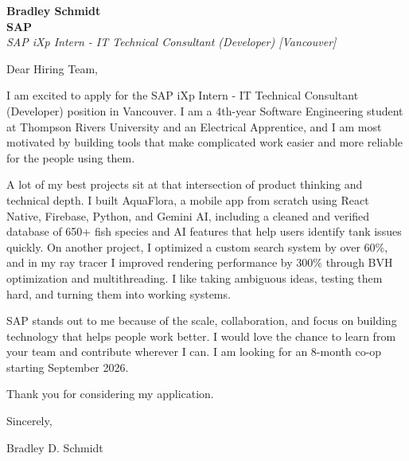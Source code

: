 \documentclass[11pt]{article}
\begin{document}
\textbf{Bradley Schmidt}\\
\vspace{0.5em}
\textbf{SAP}\\
\textit{SAP iXp Intern - IT Technical Consultant (Developer) [Vancouver]}

Dear Hiring Team,

\par

I am excited to apply for the SAP iXp Intern - IT Technical Consultant (Developer) position in Vancouver. I am a 4th-year Software Engineering student at Thompson Rivers University and an Electrical Apprentice, and I am most motivated by building tools that make complicated work easier and more reliable for the people using them.

\par

A lot of my best projects sit at that intersection of product thinking and technical depth. I built AquaFlora, a mobile app from scratch using React Native, Firebase, Python, and Gemini AI, including a cleaned and verified database of 650+ fish species and AI features that help users identify tank issues quickly. On another project, I optimized a custom search system by over 60\%, and in my ray tracer I improved rendering performance by 300\% through BVH optimization and multithreading. I like taking ambiguous ideas, testing them hard, and turning them into working systems.

\par

SAP stands out to me because of the scale, collaboration, and focus on building technology that helps people work better. I would love the chance to learn from your team and contribute wherever I can. I am looking for an 8-month co-op starting September 2026.

\par

Thank you for considering my application.

\par

Sincerely,

\par

Bradley D. Schmidt
\end{document}
